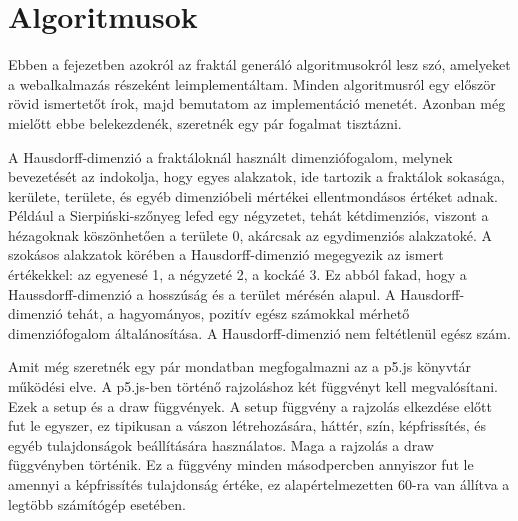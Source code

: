 \chapter*{Algoritmusok}
Ebben a fejezetben azokról az fraktál generáló algoritmusokról lesz szó, amelyeket a webalkalmazás részeként leimplementáltam. Minden algoritmusról egy először rövid ismertetőt írok, majd bemutatom az implementáció menetét. Azonban még mielőtt ebbe belekezdenék, szeretnék egy pár fogalmat tisztázni.
\par A Hausdorff-dimenzió a fraktáloknál használt dimenziófogalom, melynek bevezetését az indokolja, hogy egyes alakzatok, ide tartozik a fraktálok sokasága, kerülete, területe, és egyéb dimenzióbeli mértékei ellentmondásos értéket adnak. Például a Sierpiński-szőnyeg lefed egy négyzetet, tehát kétdimenziós, viszont a hézagoknak köszönhetően a területe 0, akárcsak az egydimenziós alakzatoké. A szokásos alakzatok körében a Hausdorff-dimenzió megegyezik az ismert értékekkel: az egyenesé 1, a négyzeté 2, a kockáé 3. Ez abból fakad, hogy a Haussdorff-dimenzió a hosszúság és a terület mérésén alapul. A Hausdorff-dimenzió tehát, a hagyományos, pozitív egész számokkal mérhető dimenziófogalom általánosítása. A Hausdorff-dimenzió nem feltétlenül egész szám. \cite{hausdorff}
\par Amit még szeretnék egy pár mondatban megfogalmazni az a p5.js könyvtár működési elve. A p5.js-ben történő rajzoláshoz két függvényt kell megvalósítani. Ezek a setup és a draw függvények. A setup függvény a rajzolás elkezdése előtt fut le egyszer, ez tipikusan a vászon létrehozására, háttér, szín, képfrissítés, és egyéb tulajdonságok beállítására használatos. Maga a rajzolás a draw függvényben történik. Ez a függvény minden másodpercben annyiszor fut le amennyi a képfrissítés tulajdonság értéke, ez alapértelmezetten 60-ra van állítva a legtöbb számítógép esetében. 
